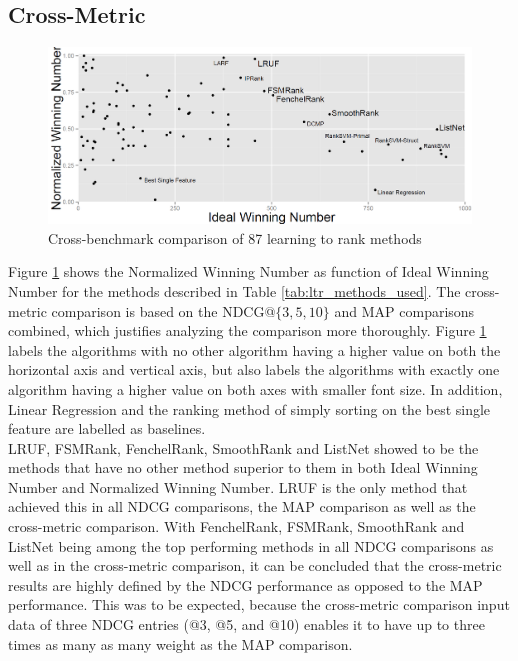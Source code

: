 \documentclass{sig-alternate}
\begin{document}
\subsection{Cross-Metric}
\begin{figure}
\includegraphics[scale=0.4235]{gfx/combined_normalized_winnum}
\caption{Cross-benchmark comparison of 87 learning to rank methods}
\label{fig:normalized_winning_number_all}
\end{figure}
Figure \ref{fig:normalized_winning_number_all} shows the Normalized Winning Number as function of Ideal Winning Number for the methods described in Table \ref{tab:ltr_methods_used}. The cross-metric comparison is based on the NDCG@$\{3,5,10\}$ and MAP comparisons combined, which justifies analyzing the comparison more thoroughly. Figure \ref{fig:normalized_winning_number_all} labels the algorithms with no other algorithm having a higher value on both the horizontal axis and vertical axis, but also labels the algorithms with exactly one algorithm having a higher value on both axes with smaller font size. In addition, Linear Regression and the ranking method of simply sorting on the best single feature are labelled as baselines.\\

LRUF, FSMRank, FenchelRank, SmoothRank and ListNet showed to be the methods that have no other method superior to them in both Ideal Winning Number and Normalized Winning Number. LRUF is the only method that achieved this in all NDCG comparisons, the MAP comparison as well as the cross-metric comparison. With FenchelRank, FSMRank, SmoothRank and ListNet being among the top performing methods in all NDCG comparisons as well as in the cross-metric comparison, it can be concluded that the cross-metric results are highly defined by the NDCG performance as opposed to the MAP performance. This was to be expected, because the cross-metric comparison input data of three NDCG entries (@3, @5, and @10) enables it to have up to three times as many as many weight as the MAP comparison.\\
\end{document}
